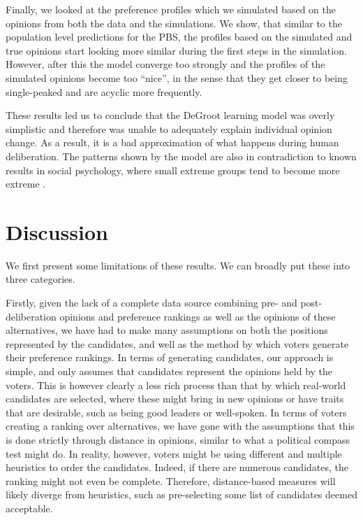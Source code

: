Finally, we looked at the preference profiles which we simulated based on the
opinions from both the data and the simulations. We show, that similar to the
population level predictions for the PBS, the profiles based on the simulated
and true opinions start looking more similar during the first steps in the
simulation. However, after this the model converge too strongly and the
profiles of the simulated opinions become too ``nice'', in the sense that they
get closer to being single-peaked and are acyclic more frequently.

These results led us to conclude that the DeGroot learning model was overly
simplistic and therefore was unable to adequately explain individual opinion
change. As a result, it is a bad approximation of what happens during human
deliberation. The patterns shown by the model are also in contradiction to known results in
social psychology, where small extreme groups tend to become more extreme \cite{myersPolarizingEffectGroup1975}.

\section{Discussion}

We first present some limitations of these results. We can broadly put these
into three categories.

Firstly, given the lack of a complete data source combining pre- and
post-deliberation opinions and preference rankings as well as the opinions of
these alternatives, we have had to make many assumptions on both the positions
represented by the candidates, and well as the method by which voters generate
their preference rankings. In terms of generating candidates, our
approach is simple, and only assumes that candidates represent the opinions held
by the voters. This is however clearly a less rich process than that by which
real-world candidates are selected, where these might bring in new opinions or
have traits that are desirable, such as being good leaders or well-spoken. In
terms of voters creating a ranking over alternatives, we have gone with the
assumptions that this is done strictly through distance in opinions, similar to
what a political compass test might do. In reality, however, voters might be
using different and multiple heuristics to order the candidates. Indeed, if
there are numerous candidates, the ranking might not even be complete.
Therefore, distance-based measures will likely diverge from heuristics, such as
pre-selecting some list of candidates deemed acceptable.


